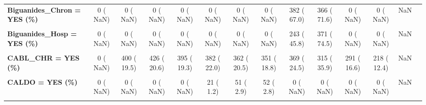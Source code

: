 \documentclass[
]{article}
\begin{document}
\begin{table}[H]
\begin{tabular}[t]{>{\raggedright\arraybackslash}p{5em}ccccccccccccc}
\textbf{Biguanides\_Chron = YES (\%)} & 0 (  NaN) & 0 (  NaN) & 0 (  NaN) & 0 (  NaN) & 0 (  NaN) & 0 (  NaN) & 0 (  NaN) & 382 ( 67.0) & 366 ( 71.6) & 0 (  NaN) & 0 (  NaN) & NaN & \\
\textbf{\cellcolor{gray!10}{Biguanides\_Disch = YES (\%)}} & \cellcolor{gray!10}{0 (  NaN)} & \cellcolor{gray!10}{0 (  NaN)} & \cellcolor{gray!10}{0 (  NaN)} & \cellcolor{gray!10}{0 (  NaN)} & \cellcolor{gray!10}{0 (  NaN)} & \cellcolor{gray!10}{0 (  NaN)} & \cellcolor{gray!10}{0 (  NaN)} & \cellcolor{gray!10}{377 ( 69.7)} & \cellcolor{gray!10}{369 ( 72.8)} & \cellcolor{gray!10}{0 (  NaN)} & \cellcolor{gray!10}{0 (  NaN)} & \cellcolor{gray!10}{NaN} & \cellcolor{gray!10}{}\\
\textbf{Biguanides\_Hosp = YES (\%)} & 0 (  NaN) & 0 (  NaN) & 0 (  NaN) & 0 (  NaN) & 0 (  NaN) & 0 (  NaN) & 0 (  NaN) & 243 ( 45.8) & 371 ( 74.5) & 0 (  NaN) & 0 (  NaN) & NaN & \\
\textbf{\cellcolor{gray!10}{CABG\_30D = YES (\%)}} & \cellcolor{gray!10}{166 (  9.3)} & \cellcolor{gray!10}{209 ( 10.2)} & \cellcolor{gray!10}{176 (  8.4)} & \cellcolor{gray!10}{176 (  8.5)} & \cellcolor{gray!10}{163 (  9.3)} & \cellcolor{gray!10}{138 (  7.8)} & \cellcolor{gray!10}{142 (  7.5)} & \cellcolor{gray!10}{138 (  7.7)} & \cellcolor{gray!10}{98 (  6.6)} & \cellcolor{gray!10}{132 (  8.8)} & \cellcolor{gray!10}{122 ( 10.2)} & \cellcolor{gray!10}{0.003} & \cellcolor{gray!10}{}\\
\textbf{CABL\_CHR = YES (\%)} & 0 (  NaN) & 400 ( 19.5) & 426 ( 20.6) & 395 ( 19.3) & 382 ( 22.0) & 362 ( 20.5) & 351 ( 18.8) & 369 ( 24.5) & 315 ( 35.9) & 291 ( 16.6) & 218 ( 12.4) & NaN & \\
\textbf{\cellcolor{gray!10}{CACEI = YES (\%)}} & \cellcolor{gray!10}{0 (  NaN)} & \cellcolor{gray!10}{0 (  NaN)} & \cellcolor{gray!10}{534 ( 25.8)} & \cellcolor{gray!10}{0 (  NaN)} & \cellcolor{gray!10}{560 ( 32.2)} & \cellcolor{gray!10}{613 ( 34.8)} & \cellcolor{gray!10}{558 ( 29.8)} & \cellcolor{gray!10}{490 ( 31.4)} & \cellcolor{gray!10}{415 ( 36.0)} & \cellcolor{gray!10}{356 ( 20.3)} & \cellcolor{gray!10}{324 ( 18.5)} & \cellcolor{gray!10}{NaN} & \cellcolor{gray!10}{}\\
\textbf{CALDO = YES (\%)} & 0 (  NaN) & 0 (  NaN) & 0 (  NaN) & 0 (  NaN) & 21 (  1.2) & 51 (  2.9) & 52 (  2.8) & 0 (  NaN) & 0 (  NaN) & 0 (  NaN) & 0 (  NaN) & NaN & \\
\textbf{\cellcolor{gray!10}{CALL\_ECG (mean (SD))}} & \cellcolor{gray!10}{NaN (NA)} & \cellcolor{gray!10}{NaN (NA)} & \cellcolor{gray!10}{186.74 (785.98)} & \cellcolor{gray!10}{146.91 (610.41)} & \cellcolor{gray!10}{155.16 (1760.22)} & \cellcolor{gray!10}{71.41 (275.29)} & \cellcolor{gray!10}{72.63 (266.08)} & \cellcolor{gray!10}{97.55 (424.53)} & \cellcolor{gray!10}{105.18 (1408.52)} & \cellcolor{gray!10}{64.72 (234.17)} & \cellcolor{gray!10}{81.38 (255.11)} & \cellcolor{gray!10}{<0.001} & \cellcolor{gray!10}{}\\

\end{tabular}
\end{table}
\end{document}
